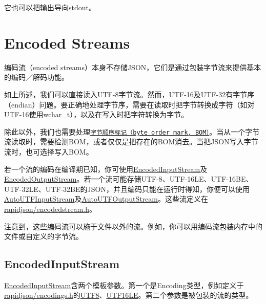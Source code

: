 它也可以把输出导向{\ttfamily stdout}。\hypertarget{md_Commun_Externe_RapidJSON_doc_stream.zh-cn_EncodedStreams}{}\section{Encoded Streams}\label{md_Commun_Externe_RapidJSON_doc_stream.zh-cn_EncodedStreams}
编码流（encoded streams）本身不存储\+J\+S\+O\+N，它们是通过包装字节流来提供基本的编码／解码功能。

如上所述，我们可以直接读入\+U\+T\+F-\/8字节流。然而，\+U\+T\+F-\/16及\+U\+T\+F-\/32有字节序（endian）问题。要正确地处理字节序，需要在读取时把字节转换成字符（如对\+U\+T\+F-\/16使用{\ttfamily wchar\+\_\+t}），以及在写入时把字符转换为字节。

除此以外，我们也需要处理\href{http://en.wikipedia.org/wiki/Byte_order_mark}{\tt 字节顺序标记（byte order mark, B\+O\+M）}。当从一个字节流读取时，需要检测\+B\+O\+M，或者仅仅是把存在的\+B\+O\+M消去。当把\+J\+S\+O\+N写入字节流时，也可选择写入\+B\+O\+M。

若一个流的编码在编译期已知，你可使用{\ttfamily \hyperlink{class_encoded_input_stream}{Encoded\+Input\+Stream}}及{\ttfamily \hyperlink{class_encoded_output_stream}{Encoded\+Output\+Stream}}。若一个流可能存储\+U\+T\+F-\/8、\+U\+T\+F-\/16\+L\+E、\+U\+T\+F-\/16\+B\+E、\+U\+T\+F-\/32\+L\+E、\+U\+T\+F-\/32\+B\+E的\+J\+S\+O\+N，并且编码只能在运行时得知，你便可以使用{\ttfamily \hyperlink{class_auto_u_t_f_input_stream}{Auto\+U\+T\+F\+Input\+Stream}}及{\ttfamily \hyperlink{class_auto_u_t_f_output_stream}{Auto\+U\+T\+F\+Output\+Stream}}。这些流定义在{\ttfamily \hyperlink{encodedstream_8h_source}{rapidjson/encodedstream.\+h}}。

注意到，这些编码流可以施于文件以外的流。例如，你可以用编码流包装内存中的文件或自定义的字节流。\hypertarget{md_Commun_Externe_RapidJSON_doc_stream.zh-cn_EncodedInputStream}{}\subsection{Encoded\+Input\+Stream}\label{md_Commun_Externe_RapidJSON_doc_stream.zh-cn_EncodedInputStream}
{\ttfamily \hyperlink{class_encoded_input_stream}{Encoded\+Input\+Stream}}含两个模板参数。第一个是{\ttfamily Encoding}类型，例如定义于{\ttfamily \hyperlink{encodings_8h_source}{rapidjson/encodings.\+h}}的{\ttfamily \hyperlink{struct_u_t_f8}{U\+T\+F8}}、{\ttfamily \hyperlink{struct_u_t_f16_l_e}{U\+T\+F16\+LE}}。第二个参数是被包装的流的类型。


